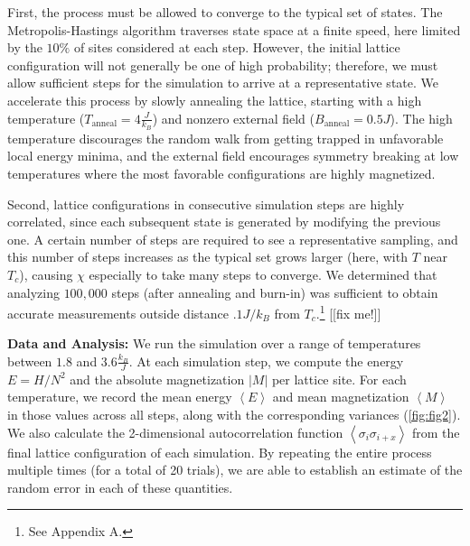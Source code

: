 \documentclass[letter,scriptaddress,twocolumn, prl,nofootinbib]{revtex4}
\newcommand{\submin}[1]{\left\langle #1 \right\rangle}
\begin{document}
First, the process must be allowed to converge to the typical set of states. The Metropolis-Hastings algorithm traverses state space at a finite speed, here limited by the $10\%$ of sites considered at each step. However, the initial lattice configuration will not generally be one of high probability; therefore, we must allow sufficient steps for the simulation to arrive at a representative state. We accelerate this process by slowly annealing the lattice, starting with a high temperature ($T_\text{anneal} = 4 \frac{J}{k_B}$) and nonzero external field ($B_\text{anneal} = 0.5 J$). The high temperature discourages the random walk from getting trapped in unfavorable local energy minima, and the external field encourages symmetry breaking at low temperatures where the most favorable configurations are highly magnetized.

Second, lattice configurations in consecutive simulation steps are highly correlated, since each subsequent state is generated by modifying the previous one. A certain number of steps are required to see a representative sampling, and this number of steps increases as the typical set grows larger (here, with $T$ near $T_c$), causing $\chi$ especially to take many steps to converge. We determined that analyzing $100,000$ steps (after annealing and burn-in) was sufficient to obtain accurate measurements outside distance $.1 J/k_B$ from $T_c$.\footnote{See Appendix A.} [[fix me!]]

\textbf{Data and Analysis:} We run the simulation over a range of temperatures between $1.8$ and $3.6\frac{k_B}{J}$. At each simulation step, we compute the energy $E = H / N^2$ and the absolute magnetization $|M|$ per lattice site. For each temperature, we record the mean energy $\submin{E}$ and mean magnetization $\submin{M}$ in those values across all steps, along with the corresponding variances (\autoref{fig:fig2}). We also calculate the 2-dimensional autocorrelation function $\submin{\sigma_i\sigma_{i + x}}$ from the final lattice configuration of each simulation. By repeating the entire process multiple times (for a total of 20 trials), we are able to establish an estimate of the random error in each of these quantities. 
\end{document}
